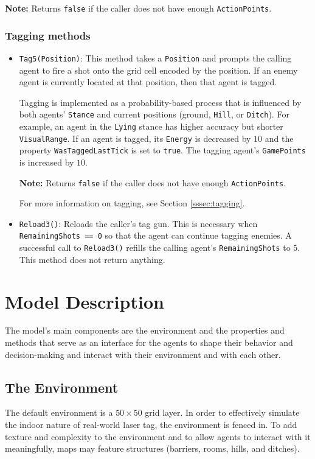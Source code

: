 \documentclass[a4paper,english,DIV=16,11pt,parskip=half,dvipsnames,listof=totoc,index=totoc,bibliography=totoc]{scrartcl}
\begin{document}
\begin{itemize}
  \faLightbulbO\: \textbf{Note:} Returns \texttt{false} if the caller does not have enough \texttt{ActionPoints}.
\end{itemize}
%
\subsubsection{Tagging methods} \label{sssec:tagMeth}
\begin{itemize}
  \item \texttt{Tag5(Position)}: This method takes a \texttt{Position} and prompts the calling agent to fire a shot onto the grid cell encoded by the position. If an enemy agent is currently located at that position, then that agent is tagged.
  
  Tagging is implemented as a probability-based process that is influenced by both agents' \texttt{Stance} and current positions (ground, \texttt{Hill}, or \texttt{Ditch}). For example, an agent in the \texttt{Lying} stance has higher accuracy but shorter \texttt{VisualRange}. If an agent is tagged, its \texttt{Energy} is decreased by $10$ and the property \texttt{WasTaggedLastTick} is set to \texttt{true}. The tagging agent's \texttt{GamePoints} is increased by $10$.

  \faLightbulbO\: \textbf{Note:} Returns \texttt{false} if the caller does not have enough \texttt{ActionPoints}.
  
  For more information on tagging, see Section \ref{sssec:tagging}.
  \item \texttt{Reload3()}: Reloads the caller's tag gun. This is necessary when \texttt{RemainingShots == 0} so that the agent can continue tagging enemies. A successful call to \texttt{Reload3()} refills the calling agent's \texttt{RemainingShots} to $5$. This method does not return anything.

\end{itemize}
%
%
\section{Model Description} \label{sec:modelDesc}
The model's main components are the environment and the properties and methods that serve as an interface for the agents to shape their behavior and decision-making and interact with their environment and with each other.
%
\subsection{The Environment} \label{ssec:env}
The default environment is a $50\times 50$ grid layer. In order to effectively simulate the indoor nature of real-world laser tag, the environment is fenced in. To add texture and complexity to the environment and to allow agents to interact with it meaningfully, maps may feature structures (barriers, rooms, hills, and ditches).
\end{document}
